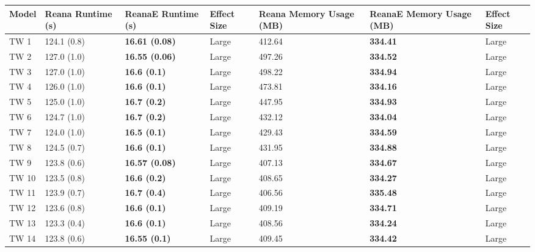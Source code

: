 \begin{tabular}{lllllll}
\toprule
 Model & Reana Runtime (s) &     ReanaE Runtime (s) & Effect Size & Reana Memory Usage (MB) & ReanaE Memory Usage (MB) & Effect Size \\
\midrule
  TW 1 &       124.1 (0.8) &  \textbf{16.61 (0.08)} &       Large &                  412.64 &          \textbf{334.41} &       Large \\
  TW 2 &       127.0 (1.0) &  \textbf{16.55 (0.06)} &       Large &                  497.26 &          \textbf{334.52} &       Large \\
  TW 3 &       127.0 (1.0) &    \textbf{16.6 (0.1)} &       Large &                  498.22 &          \textbf{334.94} &       Large \\
  TW 4 &       126.0 (1.0) &    \textbf{16.6 (0.1)} &       Large &                  473.81 &          \textbf{334.16} &       Large \\
  TW 5 &       125.0 (1.0) &    \textbf{16.7 (0.2)} &       Large &                  447.95 &          \textbf{334.93} &       Large \\
  TW 6 &       124.7 (1.0) &    \textbf{16.7 (0.2)} &       Large &                  432.12 &          \textbf{334.04} &       Large \\
  TW 7 &       124.0 (1.0) &    \textbf{16.5 (0.1)} &       Large &                  429.43 &          \textbf{334.59} &       Large \\
  TW 8 &       124.5 (0.7) &    \textbf{16.6 (0.1)} &       Large &                  431.95 &          \textbf{334.88} &       Large \\
  TW 9 &       123.8 (0.6) &  \textbf{16.57 (0.08)} &       Large &                  407.13 &          \textbf{334.67} &       Large \\
 TW 10 &       123.5 (0.8) &    \textbf{16.6 (0.2)} &       Large &                  408.65 &          \textbf{334.27} &       Large \\
 TW 11 &       123.9 (0.7) &    \textbf{16.7 (0.4)} &       Large &                  406.56 &          \textbf{335.48} &       Large \\
 TW 12 &       123.6 (0.8) &    \textbf{16.6 (0.1)} &       Large &                  409.19 &          \textbf{334.71} &       Large \\
 TW 13 &       123.3 (0.4) &    \textbf{16.6 (0.1)} &       Large &                  408.56 &          \textbf{334.24} &       Large \\
 TW 14 &       123.8 (0.6) &   \textbf{16.55 (0.1)} &       Large &                  409.45 &          \textbf{334.42} &       Large \\

\end{tabular}
